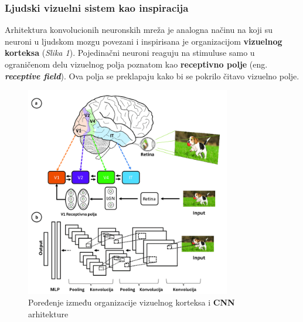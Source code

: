 \documentclass[12pt]{article}
\begin{document}
   \subsubsection{Ljudski vizuelni sistem kao inspiracija}
   Arhitektura konvolucionih neuronskih mreža je analogna načinu na koji su neuroni u
   ljudskom mozgu povezani i inspirisana je organizacijom \textbf{vizuelnog korteksa} (\textit{Slika 1}). 
   Pojedinačni neuroni reaguju na stimuluse samo u ograničenom delu vizuelnog polja 
   poznatom kao \textbf{receptivno polje} (eng. \textbf{\textit{receptive field}}). 
   Ova polja se preklapaju kako bi se pokrilo čitavo vizuelno polje.


   \begin{figure}[h!]
      \centering
      \vspace{1.5cm} %
      \includegraphics[width=0.8\textwidth]{visual_cortex.png}
      \caption{Poređenje između organizacije vizuelnog korteksa i \textbf{CNN} arhitekture \cite{hvc_pic}}
      \label{fig:visual_cortex}
   \end{figure}

   \newpage
\end{document}

